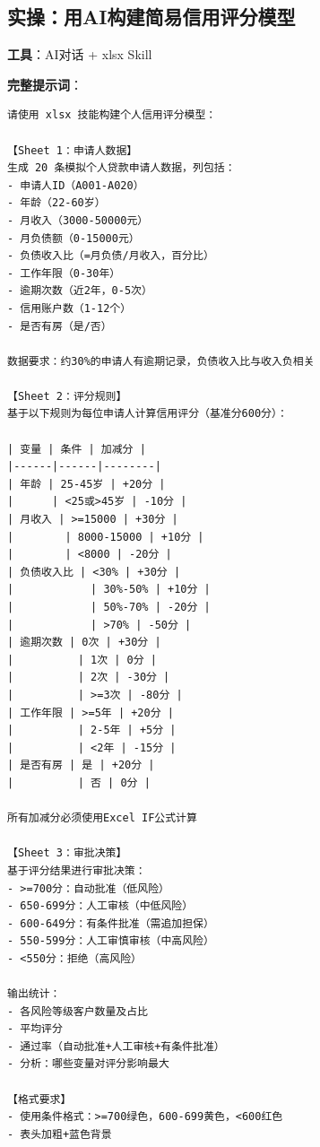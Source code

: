 \subsection{实操：用AI构建简易信用评分模型}

\begin{practicebox}[实操：个人信用评分模型]
\textbf{工具}：AI对话 + xlsx Skill

\textbf{完整提示词}：

\begin{lstlisting}
请使用 xlsx 技能构建个人信用评分模型：

【Sheet 1：申请人数据】
生成 20 条模拟个人贷款申请人数据，列包括：
- 申请人ID（A001-A020）
- 年龄（22-60岁）
- 月收入（3000-50000元）
- 月负债额（0-15000元）
- 负债收入比（=月负债/月收入，百分比）
- 工作年限（0-30年）
- 逾期次数（近2年，0-5次）
- 信用账户数（1-12个）
- 是否有房（是/否）

数据要求：约30%的申请人有逾期记录，负债收入比与收入负相关

【Sheet 2：评分规则】
基于以下规则为每位申请人计算信用评分（基准分600分）：

| 变量 | 条件 | 加减分 |
|------|------|--------|
| 年龄 | 25-45岁 | +20分 |
|      | <25或>45岁 | -10分 |
| 月收入 | >=15000 | +30分 |
|        | 8000-15000 | +10分 |
|        | <8000 | -20分 |
| 负债收入比 | <30% | +30分 |
|            | 30%-50% | +10分 |
|            | 50%-70% | -20分 |
|            | >70% | -50分 |
| 逾期次数 | 0次 | +30分 |
|          | 1次 | 0分 |
|          | 2次 | -30分 |
|          | >=3次 | -80分 |
| 工作年限 | >=5年 | +20分 |
|          | 2-5年 | +5分 |
|          | <2年 | -15分 |
| 是否有房 | 是 | +20分 |
|          | 否 | 0分 |

所有加减分必须使用Excel IF公式计算

【Sheet 3：审批决策】
基于评分结果进行审批决策：
- >=700分：自动批准（低风险）
- 650-699分：人工审核（中低风险）
- 600-649分：有条件批准（需追加担保）
- 550-599分：人工审慎审核（中高风险）
- <550分：拒绝（高风险）

输出统计：
- 各风险等级客户数量及占比
- 平均评分
- 通过率（自动批准+人工审核+有条件批准）
- 分析：哪些变量对评分影响最大

【格式要求】
- 使用条件格式：>=700绿色，600-699黄色，<600红色
- 表头加粗+蓝色背景
\end{lstlisting}
\end{practicebox}

